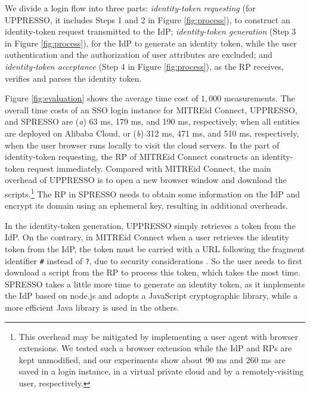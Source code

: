 We divide a login flow into three parts:
{\em identity-token requesting} (for UPPRESSO, it includes Steps 1 and 2 in Figure \ref{fig:process}),
  to construct an identity-token request transmitted to the IdP;
{\em identity-token generation} (Step 3 in Figure \ref{fig:process}),
    for the IdP to generate an identity token, while the user authentication and  the authorization of user attributes are excluded;
and {\em identity-token acceptance} (Step 4 in Figure \ref{fig:process}),
    as the RP receives, verifies and parses the identity token.


Figure \ref{fig:evaluation} shows
        the average time cost of $1,000$ measurements.
The overall time costs of an SSO login instance for MITREid Connect, UPPRESSO, and SPRESSO are
 (\emph{a}) 63 ms, 179 ms, and 190 ms, respectively, when all entities are deployed on Alibaba Cloud,
or
 (\emph{b})
312 ms, 471 ms, and 510 ms, respectively, when the user browser runs locally to visit the cloud servers.
%
In the part of identity-token requesting, %
the RP of MITREid Connect constructs an identity-token request immediately.
Compared with MITREid Connect, the main overhead of UPPRESSO is to open a new browser window and download the scripts.\footnote{This overhead may be mitigated %
    by implementing a user agent with browser extensions.
We tested such a browser extension while the IdP and RPs are kept unmodified,
and our experiments show about 90 ms and 260 ms are saved in a login instance,
    in a virtual private cloud and by a remotely-visiting user, respectively.}
The RP in SPRESSO needs  to obtain some information on the IdP  %
     and encrypt its domain using an ephemeral key, resulting in additional overheads.




In the identity-token generation,
UPPRESSO simply retrieves a token from the IdP.
On the contrary, in MITREid Connect when a user retrieves the identity token from the IdP,
 the token must be carried with a URL following the fragment identifier \verb+#+ instead of \verb+?+, due to security considerations \cite{de2014oauth}.
So the user needs to first download a script from the RP to process this token, which takes the most time.
SPRESSO takes a little more time to generate an identity token,
    as it implements the IdP based on node.js and adopts a JavaScript cryptographic library,
 while a more efficient Java library is used in the others.

